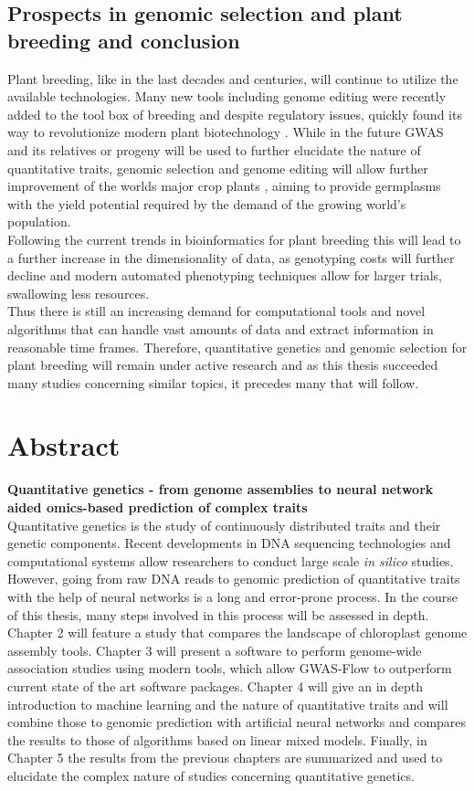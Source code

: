 \section{Prospects in genomic selection and plant breeding and conclusion}
Plant breeding, like in the last decades and centuries, will continue to utilize the
available technologies. Many new tools including genome editing were recently added to the
tool box of breeding and despite regulatory issues, quickly found its way to
revolutionize modern plant biotechnology \cite{araki2015towards}. While in the future GWAS
and its relatives or progeny will be used to further elucidate the nature of quantitative
traits, genomic selection and genome editing will allow further improvement of the worlds
major crop plants \cite{rodriguez2017engineering}, aiming to provide germplasms with the
yield
potential required by the demand of the growing world's population.\\
Following the current trends in bioinformatics for plant breeding this will lead to a
further increase in the dimensionality of data, as genotyping costs will further decline
and modern automated phenotyping techniques allow for larger trials, swallowing less
resources. \\
Thus there is still an increasing demand for computational tools and novel algorithms that
can handle vast amounts of data and extract information in reasonable time
frames. Therefore, quantitative genetics and genomic selection for plant breeding will
remain under active research and as this thesis succeeded many studies concerning similar
topics, it precedes many that will follow.


\chapter{Abstract} %
\textbf{Quantitative genetics - from genome assemblies to neural network aided omics-based prediction of complex traits}\\
Quantitative genetics is the study of continuously distributed traits and their genetic
components. Recent developments in DNA sequencing technologies and computational systems
allow researchers to conduct large scale \textit{in silico} studies. However, going from
raw DNA reads to genomic prediction of quantitative traits with the help of neural
networks is a long and error-prone process. In the course of this thesis, many steps
involved in this process will be assessed in depth. Chapter 2 will feature a study that
compares the landscape of chloroplast genome assembly tools. Chapter 3 will present a
software to perform genome-wide association studies using modern tools, which allow
GWAS-Flow to outperform current state of the art software packages. Chapter 4 will give an
in depth introduction to machine learning and the nature of quantitative traits and will
combine those to genomic prediction with artificial neural networks and compares the
results to those of algorithms based on linear mixed models. Finally, in Chapter 5 the
results from the previous chapters are summarized and used to elucidate the complex nature
of studies concerning quantitative genetics.

